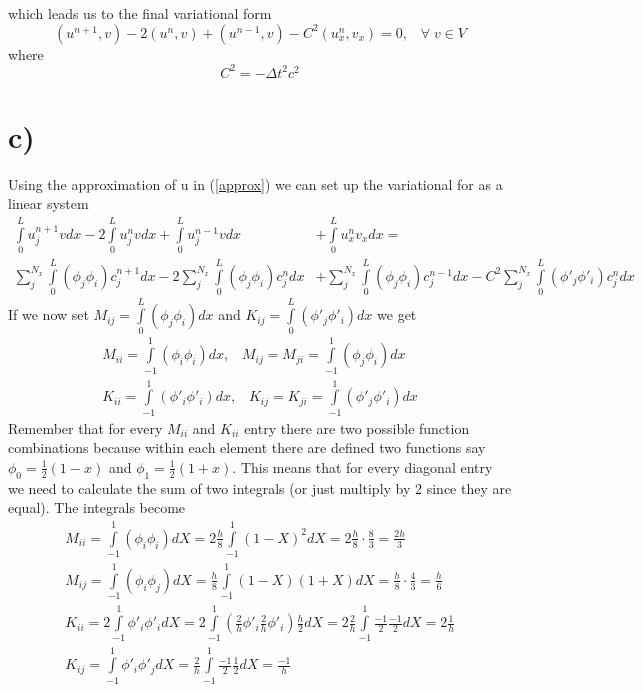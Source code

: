 \documentclass[a4paper,english, 10pt, twoside]{article}
\begin{document}
which leads us to the final variational form
$$
\left(u^{n+1},v\right) -2 \left(u^n,v\right) + \left(u^{n-1},v\right) - C^2\left(u^n_x,v_x\right) = 0,\;\;\; \forall \;v\in V
$$
where
\begin{equation}\label{courrant}
 C^2 = -\Delta t^2c^2
\end{equation}

\section*{c)}
Using the approximation of u in (\ref{approx}) we can set up the variational for as a linear system
\begin{align*}
 \int\limits_0^Lu_j^{n+1}vdx -2\int\limits_0^Lu_j^nvdx + \int\limits_0^Lu_j^{n-1}vdx &+ \int\limits_0^Lu_x^nv_xdx    = \\
\sum\limits_j^{N_x}\int\limits_0^L(\phi_j\phi_i)c_j^{n+1}dx - 2\sum\limits_j^{N_x}\int\limits_0^L(\phi_j\phi_i)c_j^{n}dx &+ 
  \sum\limits_j^{N_x}\int\limits_0^L(\phi_j\phi_i)c_j^{n-1}dx - C^2\sum\limits_j^{N_x}\int\limits_0^L(\phi'_j\phi'_i)c_j^{n}dx
\end{align*}
If we now set $M_{ij} = \int\limits_0^L(\phi_j\phi_i)dx$ and $K_{ij} = \int\limits_0^L(\phi'_j\phi'_i)dx $ we get
\begin{align*}
M_{ii} =  \int\limits_{-1}^1(\phi_i\phi_i)dx, \;\;\;
M_{ij} = M_{ji} = \int\limits_{-1}^1(\phi_j\phi_i)dx \\
K_{ii} =  \int\limits_{-1}^1(\phi'_i\phi'_i)dx, \;\;\;
K_{ij} = K_{ji} = \int\limits_{-1}^1(\phi'_j\phi'_i)dx
\end{align*}
Remember that for every $M_{ii}$ and $K_{ii}$ entry there are two possible function combinations because within each element there 
are defined two functions say $\phi_0 = \frac{1}{2}(1-x)$ and $\phi_1 = \frac{1}{2}(1+x)$. This means that for every diagonal entry 
we need to calculate the sum of two integrals (or just multiply by 2 since they are equal). The integrals become
\begin{align*}
M_{ii} = \int\limits_{-1}^1(\phi_i\phi_i)dX = 2\frac{h}{8}\int\limits_{-1}^1(1-X)^2dX = 2\frac{h}{8}\cdot\frac{8}{3} = \frac{2h}{3}\\
M_{ij} = \int\limits_{-1}^1(\phi_i\phi_j)dX = \frac{h}{8}\int\limits_{-1}^1(1-X)(1+X)dX = \frac{h}{8}\cdot\frac{4}{3} = \frac{h}{6}\\
K_{ii} = 2\int\limits_{-1}^1\phi'_i\phi'_idX = 2\int\limits_{-1}^1(\frac{2}{h}\phi'_i\frac{2}{h}\phi'_i)\frac{h}{2}dX
 = 2\frac{2}{h}\int\limits_{-1}^1\frac{-1}{2}\frac{-1}{2}dX = 2\frac{1}{h}\\
K_{ij} = \int\limits_{-1}^1\phi'_i\phi'_jdX = \frac{2}{h}\int\limits_{-1}^1\frac{-1}{2}\frac{1}{2}dX = \frac{-1}{h}
\end{align*}
\end{document}
